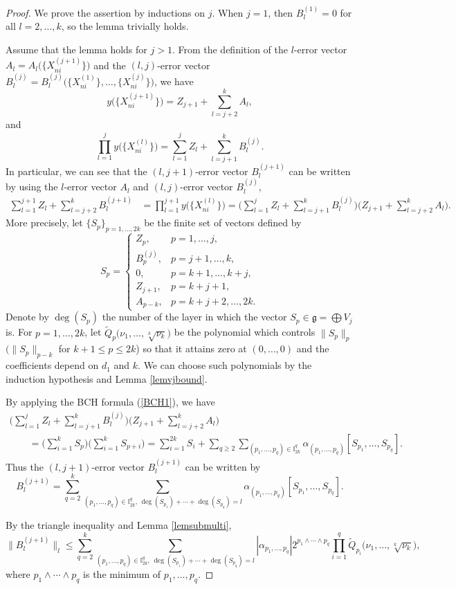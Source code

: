 \documentclass[pdftex]{sigma}
\numberwithin{equation}{section}
\newcommand{\g}{\mathfrak{g}}
\begin{document}
\begin{proof}
 We prove the assertion by inductions on $j$.
 When $j=1$,
 then $B_l^{(1)}=0$ for all $l=2,\dots,k$,
 so the lemma trivially holds.

 Assume that the lemma holds for $j>1$.
 From the definition of the $l$-error vector $A_l=A_l\big(\bigl\{X_{ni}^{(j+1)}\bigr\}\big)$ and the $(l,j)$-error vector $B_l^{(j)}=B_l^{(j)}\big(\bigl\{X_{ni}^{(1)}\bigr\},\dots,\bigl\{X_{ni}^{(j)}\bigr\}\big)$,
 we have
 \[
 y\big(\bigl\{X_{ni}^{(j+1)}\bigr\}\big)=Z_{j+1}+\sum_{l=j+2}^kA_l,
 \]
 and
 \[
 \prod_{l=1}^{j}y\big(\bigl\{X_{ni}^{(l)}\bigr\}\big)=\sum_{l=1}^{j}Z_l+\sum_{l=j+1}^kB_l^{(j)}.
 \]
 In particular,
 we can see that the $(l,j+1)$-error vector $B_l^{(j+1)}$ can be written by using the $l$-error vector $A_l$ and $(l,j)$-error vector $B_l^{(j)}$,
 \begin{align*}
\sum_{l=1}^{j+1}Z_l+\sum_{l=j+2}^kB_l^{(j+1)}
 &=\prod_{l=1}^{j+1}y\big(\bigl\{X_{ni}^{(l)}\bigr\}\big)
 =\Bigg(\sum_{l=1}^{j}Z_l+\sum_{l=j+1}^kB_l^{(j)}\Bigg)\Bigg(Z_{j+1}+\sum_{l=j+2}^kA_l\Bigg).
 \end{align*}
 More precisely,
 let $\{S_p\}_{p=1,\dots,2k}$ be the finite set of vectors defined by
 \[
 S_p=\begin{cases}
 Z_p, & p=1,\dots,j,
 \\
 B_p^{(j)}, & p=j+1,\dots,k,
 \\
 0, & p=k+1,\dots,k+j,
 \\
 Z_{j+1}, & p=k+j+1,
 \\
 A_{p-k}, & p=k+j+2,\dots,2k.
 \end{cases}
 \]
 Denote by $\deg(S_p)$ the number of the layer in which the vector $S_p\in\g=\bigoplus V_j$ is.
 For $p=1,\dots,2k$,
let $\tilde{Q}_p\big(\nu_1,\dots,\sqrt[k]{\nu_k}\big)$ be the polynomial which controls $\|S_p\|_p$ $(\|S_p\|_{p-k}$ for $k+1\leq p\allowbreak\leq 2k$) so that it attains zero at $(0,\dots,0)$ and the coefficients depend on $d_1$ and $k$.
We can choose such polynomials by the induction hypothesis and Lemma \ref{lemvjbound}.

 By applying the BCH formula (\ref{BCH1}),
 we have
 \begin{gather*}
 \Bigg(\sum_{l=1}^{j}Z_l+\sum_{l=j+1}^kB_l^{(j)}\Bigg)\Bigg(Z_{j+1}+\sum_{l=j+2}^kA_l\Bigg)
 \\ \qquad
{} = \Bigg(\sum_{i=1}^kS_p\Bigg)\Bigg(\sum_{i=1}^{k}S_{p+i}\Bigg)
 =\sum_{i=1}^{2k}S_i+\sum_{q\geq 2}\sum_{(p_1,\dots,p_q)\in \mathbb{I}_{2k}^q}\alpha_{(p_1,\dots,p_q)}[S_{p_1},\dots,S_{p_q}].
 \end{gather*}
 Thus the $(l,j+1)$-error vector $B_l^{(j+1)}$ can be written by
 \[
 B_l^{(j+1)}=\sum_{q=2}^k\sum_{(p_1,\dots,p_q)\in\mathbb{I}_{2k}^q,\, \deg(S_{p_1})+\cdots+\deg(S_{p_q})=l}\alpha_{(p_1,\dots,p_q)}[S_{p_1},\dots,S_{p_q}].
 \]

 By the triangle inequality and Lemma \ref{lemsubmulti},
 \[
 \big\|B_l^{(j+1)}\big\|_l\leq \sum_{q=2}^k\sum_{(p_1,\dots,p_q)\in\mathbb{I}_{2k}^q,\,\deg(S_{p_1}) +\cdots+\deg(S_{p_q})=l}|\alpha_{p_1,\dots,p_q}|2^{p_1\wedge\cdots\wedge p_q}\prod_{i=1}^q\tilde{Q}_{p_i}\big(\nu_1,\dots,\sqrt[k]{\nu_k}\big),
 \]
 where $p_1\wedge\cdots\wedge p_q$ is the minimum of $p_1,\dots,p_q$.
\end{proof}
\end{document}

